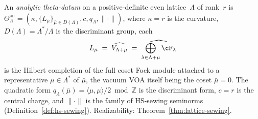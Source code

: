 \begin{definition}%
\label{def:analytic-theta-datum}%
%
An \emph{analytic theta-datum} on a positive-definite even
lattice~$\Lambda$ of rank~$r$ is
$\Theta^{\mathrm{an}}_\Lambda =
(\kappa, \{L_{\bar\mu}\}_{\bar\mu \in D(\Lambda)}, c, q_\Lambda,
\|\cdot\|)$,
where $\kappa = r$ is the curvature, $D(\Lambda) = \Lambda^*/\Lambda$
is the discriminant group,
each
\[
L_{\bar\mu}
\;=\;
\widehat{V_{\Lambda+\mu}}
\;=\;
\widehat{\bigoplus_{\lambda\in\Lambda+\mu}\cF_\lambda}
\]
is the Hilbert completion of the full coset Fock module
attached to a representative $\mu\in\Lambda^*$ of
$\bar\mu$, the vacuum VOA itself being the coset $\bar\mu=0$.
The quadratic form
$q_\Lambda(\bar\mu)=\langle\mu,\mu\rangle/2 \bmod \mathbb Z$
is the discriminant form, $c = r$ is the central charge, and
$\|\cdot\|$ is the family of HS-sewing seminorms
(Definition~\ref{def:hs-sewing}).
Realizability: Theorem~\ref{thm:lattice-sewing}.
\end{definition}

